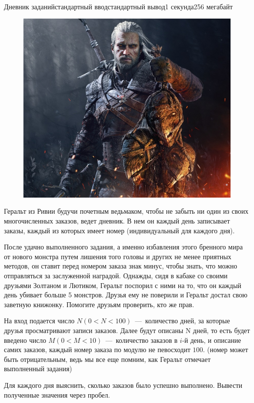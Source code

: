 \begin{problem}{Дневник заданий}{стандартный ввод}{стандартный вывод}{1 секунда}{256 мегабайт}

\begin{figure}[h]
\hspace*{\fill}
\includegraphics[width=\linewidth,natwidth=800,natheight=691]{B.jpg}
\hspace*{\fill}
\end{figure}

Геральт из Ривии будучи почетным ведьмаком, чтобы не забыть ни один из своих многочисленных заказов, ведет дневник. 
В нем он каждый день записывает заказы, каждый из которых имеет номер (индивидуальный для каждого дня). 

После удачно выполненного задания, а именно избавления этого бренного мира от нового монстра путем лишения того головы и других не менее приятных методов, 
он ставит перед номером заказа знак минус, чтобы знать, что можно отправляться за заслуженной наградой. 
Однажды, сидя в кабаке со своими друзьями Золтаном и Лютиком, Геральт поспорил с ними на то, что он каждый день убивает больше 5 монстров. Друзья ему не поверили и 
Геральт достал свою заветную книжонку. Помогите друзьям проверить, кто же прав.

\InputFile
На вход подается число $N (0 < N < 100)$~---~количество дней, за которые друзья просматривают записи заказов. 
Далее будут описаны N дней, то есть будет введено число $M (0 < M < 10)$~---~количество заказов в $i$-й день, 
и описание самих заказов, каждый номер заказа по модулю не певосходит $100$. (номер может быть отрицательным, ведь мы все еще помним, как Геральт отмечает выполненный задания)

\OutputFile
Для каждого дня выяснить, сколько заказов было успешно выполнено. Вывести полученные значения через пробел.

\Example

\begin{example}
%
\end{example}

\end{problem}

